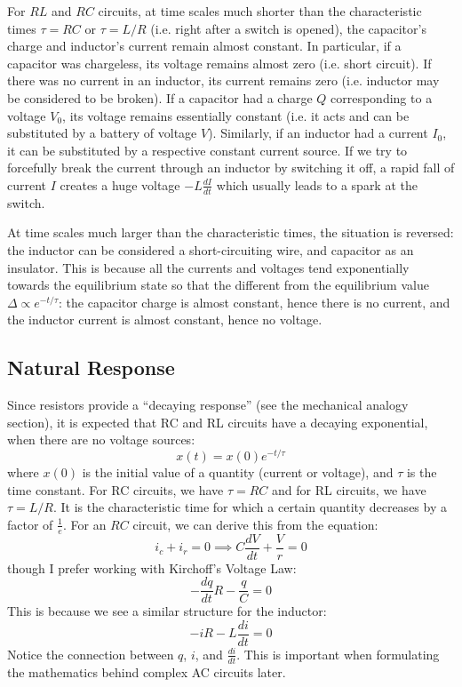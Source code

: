 \documentclass{article}
\begin{document}
\begin{idea}
    For $RL$ and $RC$ circuits, at time scales much shorter than the characteristic times $\tau = RC$ or $\tau = L/R$ (i.e. right after a switch is opened), the capacitor's charge and inductor's current remain almost constant. In particular, if a capacitor was chargeless, its voltage remains almost zero (i.e. short circuit). If there was no current in an inductor, its current remains zero (i.e. inductor may be considered to be broken). If a capacitor had a charge $Q$ corresponding to a voltage $V_0$, its voltage remains essentially constant (i.e. it acts and can be substituted by a battery of voltage $V$). Similarly, if an inductor had a current $I_0$, it can be substituted by a respective constant current source. If we try to forcefully break the current through an inductor by switching it off, a rapid fall of current $I$ creates a huge voltage $-L\frac{dI}{dt}$ which usually leads to a spark at the switch.
    \vspace{2mm}

    At time scales much larger than the characteristic times, the situation is reversed: the inductor can be considered a short-circuiting wire, and capacitor as an insulator. This is because all the currents and voltages tend exponentially towards the equilibrium state so that the different from the equilibrium value $\Delta \propto e^{-t/\tau}$: the capacitor charge is almost constant, hence there is no current, and the inductor current is almost constant, hence no voltage.
\end{idea}
\subsection{Natural Response}
Since resistors provide a ``decaying response'' (see the mechanical analogy section), it is expected that RC and RL circuits have a decaying exponential, when there are no voltage sources:
\begin{equation}
    x(t) = x(0)e^{-t/\tau}
\end{equation}
where $x(0)$ is the initial value of a quantity (current or voltage), and $\tau$ is the time constant. For RC circuits, we have $\tau = RC$ and for RL circuits, we have $\tau = L/R$. It is the characteristic time for which a certain quantity decreases by a factor of $\frac{1}{e}$. For an $RC$ circuit, we can derive this from the equation:
\begin{equation}
    i_c + i_r = 0 \implies C\frac{dV}{dt} + \frac{V}{r} = 0
\end{equation}
though I prefer working with Kirchoff's Voltage Law:
\begin{equation}
    -\frac{dq}{dt}R - \frac{q}{C} = 0
\end{equation}
This is because we see a similar structure for the inductor:
\begin{equation}
    -iR - L\frac{di}{dt} = 0
\end{equation}
Notice the connection between $q$, $i$, and $\frac{di}{dt}$. This is important when formulating the mathematics behind complex AC circuits later.
\end{document}
